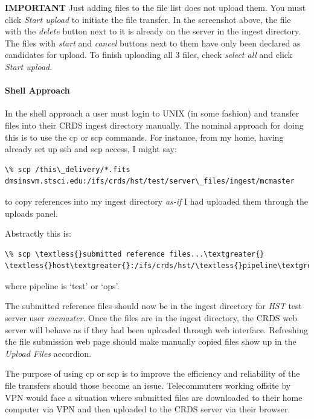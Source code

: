 \documentclass[letterpaper,10pt,english]{sphinxmanual}
\begin{document}
\textbf{IMPORTANT}  Just adding files to the file list does not upload them.   You
must click \emph{Start upload} to initiate the file transfer.   In the screenshot above,
the file with the \emph{delete} button next to it is already on the server in the
ingest directory.   The files with \emph{start} and \emph{cancel} buttons next to them have
only been declared as candidates for upload.   To finish uploading all 3 files,
check \emph{select all} and click \emph{Start upload}.


\paragraph{Shell Approach}
\label{web_site_use:shell-approach}
In the shell approach a user must login to UNIX (in some fashion) and transfer
files into their CRDS ingest directory manually.   The nominal approach
for doing this is to use the cp or scp commands.   For instance,  from my home,
having already set up ssh and scp access, I might say:

\begin{Verbatim}[commandchars=\\\{\}]
\% scp /this\_delivery/*.fits   dmsinsvm.stsci.edu:/ifs/crds/hst/test/server\_files/ingest/mcmaster
\end{Verbatim}

to copy references into my ingest directory \emph{as-if} I had uploaded them through
the uploads panel.

Abstractly this is:

\begin{Verbatim}[commandchars=\\\{\}]
\% scp \textless{}submitted reference files...\textgreater{}   \textless{}host\textgreater{}:/ifs/crds/hst/\textless{}pipeline\textgreater{}/server\_files/ingest\textless{}crds\_username\textgreater{}
\end{Verbatim}

where pipeline is `test' or `ops'.

The submitted reference files should now be in the ingest directory for \emph{HST} test server
user \emph{mcmaster}.   Once the files are in the ingest directory,  the CRDS web server
will behave as if they had been uploaded through web interface.  Refreshing the
file submission web page should make manually copied files show up in the
\emph{Upload Files} accordion.

The purpose of using cp or scp is to improve the efficiency and reliability of
the file transfers should those become an issue.  Telecommuters working offsite by VPN
would face a situation where submitted files are downloaded to their home computer via
VPN and then uploaded to the CRDS server via their browser.
\end{document}

